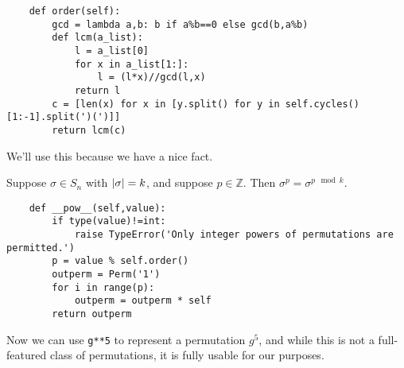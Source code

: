 \documentclass[m3380-lec-main.tex]{subfiles}
\begin{document}
\bc\begin{verbatim}
    def order(self):
        gcd = lambda a,b: b if a%b==0 else gcd(b,a%b)
        def lcm(a_list):
            l = a_list[0]
            for x in a_list[1:]:
                l = (l*x)//gcd(l,x)
            return l
        c = [len(x) for x in [y.split() for y in self.cycles()[1:-1].split(')(')]]
        return lcm(c)
\end{verbatim}
\ec
We'll use this because we have a nice fact.

\begin{lem} Suppose $\sigma\in S_n$ with $\left|\sigma\right|=k$, and suppose $p\in\mathbb{Z}$. Then ${\sigma^p = \sigma^{p\mod k}}$.
\end{lem}

\bc\begin{verbatim}
    def __pow__(self,value):
        if type(value)!=int:
            raise TypeError('Only integer powers of permutations are permitted.')
        p = value % self.order()
        outperm = Perm('1')
        for i in range(p):
            outperm = outperm * self
        return outperm
\end{verbatim}
\ec
Now we can use \verb|g**5| to represent a permutation $g^5$, and while this is not a full-featured class of permutations, it is fully usable for our purposes.
\end{document}
